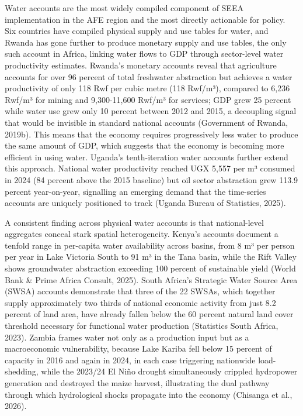 \documentclass[
  letterpaper,
  DIV=11,
  numbers=noendperiod]{scrartcl}
\begin{document}
Water accounts are the most widely compiled component of SEEA
implementation in the AFE region and the most directly actionable for
policy. Six countries have compiled physical supply and use tables for
water, and Rwanda has gone further to produce monetary supply and use
tables, the only such account in Africa, linking water flows to GDP
through sector-level water productivity estimates. Rwanda's monetary
accounts reveal that agriculture accounts for over 96 percent of total
freshwater abstraction but achieves a water productivity of only 118 Rwf
per cubic metre (118 Rwf/m³), compared to 6,236 Rwf/m³ for mining and
9,300-11,600 Rwf/m³ for services; GDP grew 25 percent while water use
grew only 10 percent between 2012 and 2015, a decoupling signal that
would be invisible in standard national accounts (Government of Rwanda,
2019b). This means that the economy requires progressively less water to
produce the same amount of GDP, which suggests that the economy is
becoming more efficient in using water. Uganda's tenth-iteration water
accounts further extend this approach. National water productivity
reached UGX 5,557 per m³ consumed in 2024 (84 percent above the 2015
baseline) but oil sector abstraction grew 113.9 percent year-on-year,
signalling an emerging demand that the time-series accounts are uniquely
positioned to track (Uganda Bureau of Statistics, 2025).

A consistent finding across physical water accounts is that
national-level aggregates conceal stark spatial heterogeneity. Kenya's
accounts document a tenfold range in per-capita water availability
across basins, from 8 m³ per person per year in Lake Victoria South to
91 m³ in the Tana basin, while the Rift Valley shows groundwater
abstraction exceeding 100 percent of sustainable yield (World Bank \&
Prime Africa Consult, 2025). South Africa's Strategic Water Source Area
(SWSA) accounts demonstrate that three of the 22 SWSAs, which together
supply approximately two thirds of national economic activity from just
8.2 percent of land area, have already fallen below the 60 percent
natural land cover threshold necessary for functional water production
(Statistics South Africa, 2023). Zambia frames water not only as a
production input but as a macroeconomic vulnerability, because Lake
Kariba fell below 15 percent of capacity in 2016 and again in 2024, in
each case triggering nationwide load-shedding, while the 2023/24 El Niño
drought simultaneously crippled hydropower generation and destroyed the
maize harvest, illustrating the dual pathway through which hydrological
shocks propagate into the economy (Chisanga et al., 2026).
\end{document}

